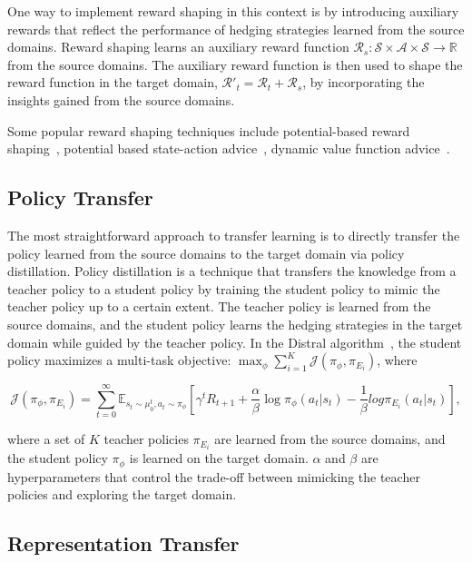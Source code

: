 One way to implement reward shaping in this context is by introducing auxiliary rewards that reflect the performance of hedging strategies learned from the source domains.
Reward shaping learns an auxiliary reward function $\mathcal{R}_s: \mathcal{S} \times \mathcal{A} \times \mathcal{S} \rightarrow \mathbb{R}$ from the source domains.
The auxiliary reward function is then used to shape the reward function in the target domain, $\mathcal{R}'_t = \mathcal{R}_t + \mathcal{R}_s$, by incorporating the insights gained from the source domains.

Some popular reward shaping techniques include potential-based reward shaping~\citep{ng1999policy}, potential based state-action advice~\citep{wiewiora2003principled}, dynamic value function advice~\citep{harutyunyan2015expressing}.

\subsection{Policy Transfer}

The most straightforward approach to transfer learning is to directly transfer the policy learned from the source domains to the target domain via policy distillation.
Policy distillation is a technique that transfers the knowledge from a teacher policy to a student policy by training the student policy to mimic the teacher policy up to a certain extent.
The teacher policy is learned from the source domains, and the student policy learns the hedging strategies in the target domain while guided by the teacher policy.
In the Distral algorithm~\citep{teh2017distral}, the student policy maximizes a multi-task objective:
$\max_{\phi} \sum_{i=1}^K \mathcal{J}(\pi_\phi, \pi_{E_i})$, where

\begin{equation}
    \mathcal{J}(\pi_\phi, \pi_{E_i}) = \sum_{t=0}^\infty \mathbb{E}_{s_t \sim \mu_0^t, a_t \sim \pi_\phi} \left[ \gamma^t R_{t+1} + \frac{\alpha}{\beta} \log \pi_{\phi}(a_t|s_t) - \frac{1}{\beta}log \pi_{E_i}(a_t|s_t) \right],
\end{equation}

where a set of $K$ teacher policies $\pi_{E_i}$ are learned from the source domains, and the student policy $\pi_\phi$ is learned on the target domain. $\alpha$ and $\beta$ are hyperparameters that control the trade-off between mimicking the teacher policies and exploring the target domain.

\subsection{Representation Transfer}


